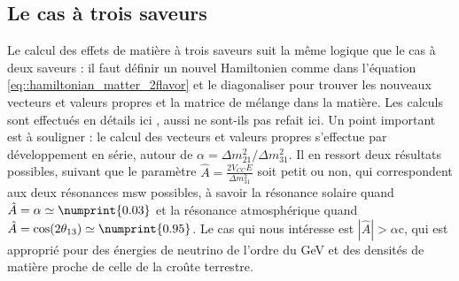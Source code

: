         \subsection{Le cas à trois saveurs}
            Le calcul des effets de matière à trois saveurs suit la même logique que le cas à deux saveurs : il faut définir un nouvel Hamiltonien comme dans l'équation \eqref{eq::hamiltonian_matter_2flavor} et le diagonaliser pour trouver les nouveaux vecteurs et valeurs propres et la matrice de mélange dans la matière. Les calculs sont effectués en détails ici \cite{Freund2001}, aussi ne sont-ils pas refait ici. Un point important est à souligner : le calcul des vecteurs et valeurs propres s'effectue par développement en série, autour de $\alpha=\Delta m^2_{21}/\Delta m^2_{31}$. Il en ressort deux résultats possibles, suivant que le paramètre $\hat{A}=\frac{2V_{CC}E}{\Delta m^2_{31}}$ soit petit ou non, qui correspondent aux deux résonances \gls{msw} possibles, à savoir la résonance solaire quand $\hat{A}=\alpha\simeq\numprint{0.03}$ et la résonance atmosphérique quand $\hat{A}=\cos(2\theta_{13})\simeq \numprint{0.95}$. Le cas qui nous intéresse est $|\hat{A}|>\alpha$c, qui est approprié pour des énergies de neutrino de l'ordre du \si{\giga\electronvolt} et des densités de matière proche de celle de la croûte terrestre.
            
